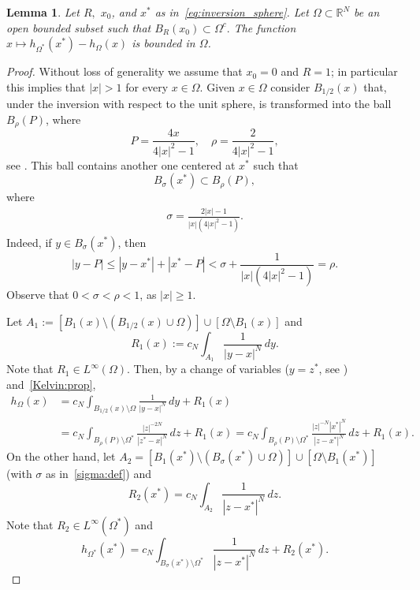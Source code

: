 \documentclass[11pt]{article}
\newcommand{\R}{\mathbb{R}}
\numberwithin{equation}{section}
\newtheorem{lemma}[theorem]{Lemma}
\begin{document}
\begin{lemma}\label{h:aux:lem}
Let $R,$ $x_0$, and $x^*$ as in~\eqref{eq:inversion_sphere}. Let $\Omega\subset\R^N$ be an open bounded subset such that $B_R(x_0)\subset \Omega^c.$ The function $x\mapsto h_{\Omega^*}(x^*)-h_\Omega(x)$ is bounded in $\Omega$.
\end{lemma}
\begin{proof}
Without loss of generality we assume that $x_0=0$ and $R=1$; in particular this implies that $|x|>1$ for every $x\in \Omega$.  Given $x \in \Omega$ consider $B_{1/2}(x)$ that, under the inversion with respect to the unit sphere, is transformed into the ball $B_\rho(P)$, where
\begin{equation*}
    P = \frac{4x}{4|x|^2-1}, \quad \rho = \frac{2}{4|x|^2-1},
\end{equation*}
see \cite[Section 2]{BZ06}. This ball contains another one centered at $x^*$ such that
\begin{equation}
    \label{eq:ball_contention}
    B_\sigma(x^*) \subset B_\rho(P),
\end{equation}
where 
\begin{align}\label{sigma:def}
\sigma = \frac{2|x|-1}{|x|(4|x|^2-1)}.
\end{align}
Indeed, if $y \in B_\sigma(x^*)$, then
\begin{equation*}
    |y-P| \le |y-x^*|+|x^*-P| < \sigma + \frac{1}{|x|(4|x|^2-1)} = \rho.
\end{equation*}
Observe that $0<\sigma< \rho < 1$, as $|x| \ge 1$. 

Let $A_1 := [B_1(x) \setminus (B_{1/2}(x) \cup \Omega)] \cup [\Omega \setminus B_1(x)]$ and
\begin{equation*}
    R_1(x) := c_N \int_{A_1} \frac{1}{|y-x|^N} \, dy.
\end{equation*}
Note that $R_1\in L^\infty(\Omega)$. Then, by a change of variables ($y=z^*$, see \cite[Proposition A.3]{B16}) and~\eqref{Kelvin:prop},
\begin{equation}
    \label{eq:h_omega_est}
    \begin{aligned}
    h_\Omega(x) &= c_N\int_{B_{1/2}(x) \setminus \Omega} \frac{1}{|y-x|^N} \, dy + R_1(x) \\
    &= c_N \int_{B_\rho(P) \setminus \Omega^*} \frac{|z|^{-2N}}{|z^*-x|^N} \, dz + R_1(x)
    = c_N \int_{B_\rho(P) \setminus \Omega^*} \frac{|z|^{-N}|x^*|^N}{|z-x^*|^N} \, dz + R_1(x).
    \end{aligned}
\end{equation}
On the other hand, let $A_2 = [B_1(x^*) \setminus (B_\sigma(x^*) \cup \Omega)] \cup [\Omega \setminus B_1(x^*)]$ (with $\sigma$ as in~\eqref{sigma:def}) and 
\begin{equation*}
    R_2(x^*) = c_N \int_{A_2} \frac{1}{|z-x^*|^N} \, dz.
\end{equation*}
Note that $R_2\in L^\infty(\Omega^*)$ and 
\begin{equation}
    \label{eq:h_omega*_est}
    h_{\Omega^*}(x^*) = c_N \int_{B_\sigma(x^*) \setminus \Omega^*} \frac{1}{|z-x^*|^N} \, dz + R_2(x^*).
\end{equation}


\end{proof}
\end{document}
